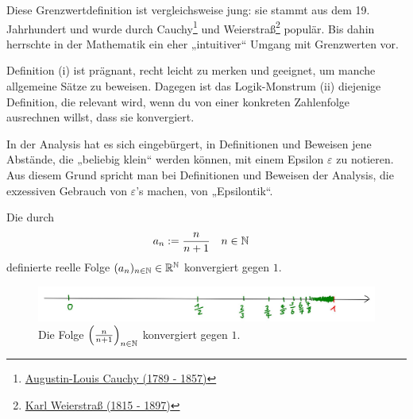 \begin{bem} 
    Diese Grenzwertdefinition ist vergleichsweise jung: sie stammt aus dem 19. Jahrhundert und wurde durch Cauchy\footnote{\href{https://de.wikipedia.org/wiki/Augustin-Louis_Cauchy}{Augustin-Louis Cauchy (1789 - 1857)}} und Weierstraß\footnote{\href{https://de.wikipedia.org/wiki/Karl_Weierstra\%C3\%9F}{Karl Weierstraß (1815 - 1897)}} populär. Bis dahin herrschte in der Mathematik ein eher „intuitiver“ Umgang mit Grenzwerten vor.
    
    Definition (i) ist prägnant, recht leicht zu merken und geeignet, um manche allgemeine Sätze zu beweisen. Dagegen ist das Logik-Monstrum (ii) diejenige Definition, die relevant wird, wenn du von einer konkreten Zahlenfolge ausrechnen willst, dass sie konvergiert.
    
    In der Analysis hat es sich eingebürgert, in Definitionen und Beweisen jene Abstände, die „beliebig klein“ werden können, mit einem Epsilon $\varepsilon$ zu notieren. Aus diesem Grund spricht man bei Definitionen und Beweisen der Analysis, die exzessiven Gebrauch von $\varepsilon$'s machen, von „Epsilontik“.
\end{bem}


\begin{bsp} \label{bsp:konvergenz}
    Die durch
    \begin{align*}
        a_n &:= \frac{n}{n+1} && n\in \mathbb N
    \end{align*}
    definierte reelle Folge $(a_n)_{n\in \mathbb N}\in \mathbb R^\mathbb N$ konvergiert gegen $1$.
\end{bsp}


\begin{figure}[ht]
    \includegraphics[width=14cm]{./_img/Konvergenzbsp.jpeg}
    \centering \caption{Die Folge $\left(\frac{n}{n+1}\right)_{n\in \mathbb N}$ konvergiert gegen $1$.}
\end{figure}


